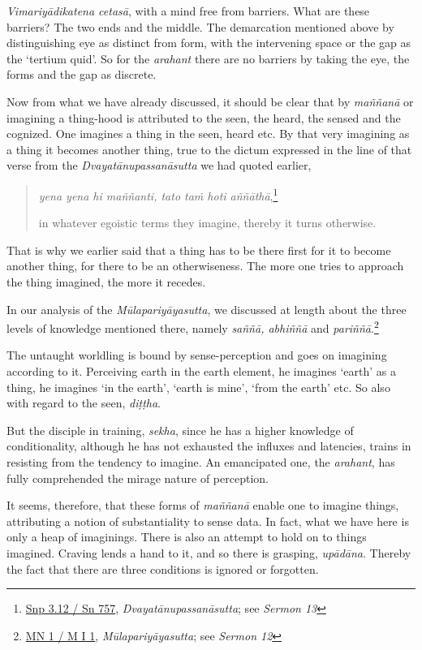 \emph{Vimariyādikatena cetasā}, with a mind free from barriers. What are these barriers? The two ends and the middle. The demarcation mentioned above by distinguishing eye as distinct from form, with the intervening space or the gap as the `tertium quid'. So for the \emph{arahant} there are no barriers by taking the eye, the forms and the gap as discrete.

Now from what we have already discussed, it should be clear that by \emph{maññanā} or imagining a thing-hood is attributed to the seen, the heard, the sensed and the cognized. One imagines a thing in the seen, heard etc. By that very imagining as a thing it becomes another thing, true to the dictum expressed in the line of that verse from the \emph{Dvayatānupassanāsutta} we had quoted earlier,

\begin{quote}
\emph{yena yena hi maññanti, tato taṁ hoti aññāthā},\footnote{\href{https://suttacentral.net/snp3.12/pli/ms}{Snp 3.12 / Sn 757}, \emph{Dvayatānupassanāsutta}; see \emph{Sermon 13}}

in whatever egoistic terms they imagine, thereby it turns otherwise.
\end{quote}

That is why we earlier said that a thing has to be there first for it to become another thing, for there to be an otherwiseness. The more one tries to approach the thing imagined, the more it recedes.

In our analysis of the \emph{Mūlapariyāyasutta}, we discussed at length about the three levels of knowledge mentioned there, namely \emph{saññā, abhiññā} and \emph{pariññā}.\footnote{\href{https://suttacentral.net/mn1/pli/ms}{MN 1 / M I 1}, \emph{Mūlapariyāyasutta}; see \emph{Sermon 12}}

The untaught worldling is bound by sense-perception and goes on imagining according to it. Perceiving earth in the earth element, he imagines `earth' as a thing, he imagines `in the earth', `earth is mine', `from the earth' etc. So also with regard to the seen, \emph{diṭṭha}.

But the disciple in training, \emph{sekha}, since he has a higher knowledge of conditionality, although he has not exhausted the influxes and latencies, trains in resisting from the tendency to imagine. An emancipated one, the \emph{arahant}, has fully comprehended the mirage nature of perception.

It seems, therefore, that these forms of \emph{maññanā} enable one to imagine things, attributing a notion of substantiality to sense data. In fact, what we have here is only a heap of imaginings. There is also an attempt to hold on to things imagined. Craving lends a hand to it, and so there is grasping, \emph{upādāna}. Thereby the fact that there are three conditions is ignored or forgotten.

